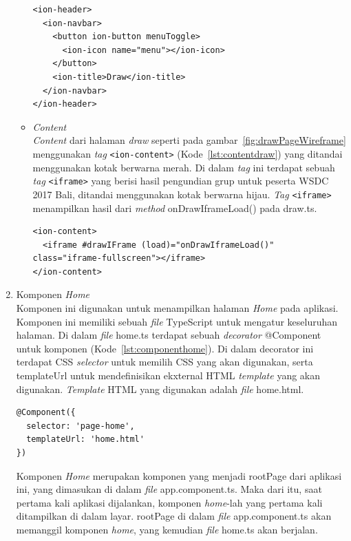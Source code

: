\begin{enumerate}
\begin{itemize}
\begin{lstlisting}[label={lst:headerdraw}, caption=\textit{Header} pada draw.html]
<ion-header>
  <ion-navbar>
    <button ion-button menuToggle>
      <ion-icon name="menu"></ion-icon>
    </button>
    <ion-title>Draw</ion-title>
  </ion-navbar>
</ion-header>
\end{lstlisting} 

		\item \textit{Content} \\
		\textit{Content} dari halaman \textit{draw} seperti pada gambar~\ref{fig:drawPageWireframe} menggunakan \textit{tag} \texttt{<ion-content>} (Kode~\ref{lst:contentdraw}) yang ditandai menggunakan kotak berwarna merah. Di dalam \textit{tag} ini terdapat sebuah \textit{tag} \texttt{<iframe>} yang berisi hasil pengundian grup untuk peserta WSDC 2017 Bali, ditandai menggunakan kotak berwarna hijau. \textit{Tag} \texttt{<iframe>} menampilkan hasil dari \textit{method} onDrawIframeLoad() pada draw.ts.
		
\begin{lstlisting}[label={lst:contentdraw}, caption=\textit{Content} pada draw.html]
<ion-content>
  <iframe #drawIFrame (load)="onDrawIframeLoad()" class="iframe-fullscreen"></iframe>
</ion-content>
\end{lstlisting} 
	\end{itemize}
	
	\newpage

	\item Komponen \textit{Home} \\
	Komponen ini digunakan untuk menampilkan halaman \textit{Home} pada aplikasi. Komponen ini memiliki sebuah \textit{file} TypeScript untuk mengatur keseluruhan halaman. Di dalam \textit{file} home.ts terdapat sebuah \textit{decorator} @Component untuk komponen (Kode~\ref{lst:componenthome}). Di dalam decorator ini terdapat CSS \textit{selector} untuk memilih CSS yang akan digunakan, serta templateUrl untuk mendefinisikan ekxternal HTML \textit{template} yang akan digunakan. \textit{Template} HTML yang digunakan adalah \textit{file} home.html.

\begin{lstlisting}[label={lst:componenthome}, caption=@Component pada home.ts]
@Component({
  selector: 'page-home',
  templateUrl: 'home.html'
})
\end{lstlisting}	
	
	Komponen \textit{Home} merupakan komponen yang menjadi rootPage dari aplikasi ini, yang dimasukan di dalam \textit{file} app.component.ts. Maka dari itu, saat pertama kali aplikasi dijalankan, komponen \textit{home}-lah yang pertama kali ditampilkan di dalam layar. rootPage di dalam \textit{file} app.component.ts akan memanggil komponen \textit{home}, yang kemudian \textit{file} home.ts akan berjalan. 
	

\end{enumerate}
